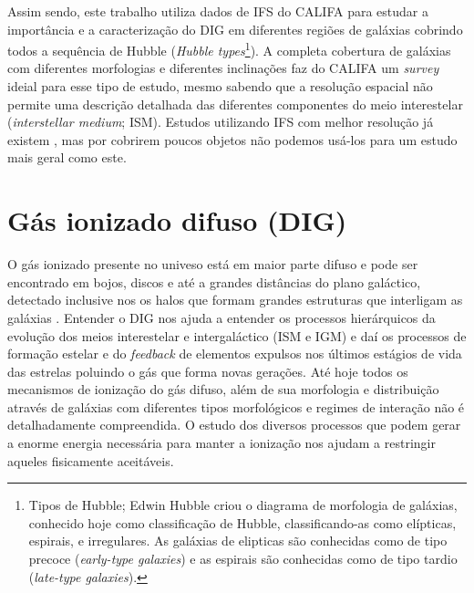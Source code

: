 Assim sendo, este trabalho utiliza dados de IFS do CALIFA para estudar a importância e a caracterização do DIG em diferentes regiões de galáxias cobrindo todos a sequência de Hubble ({\em Hubble types}\footnote{Tipos de Hubble; Edwin Hubble criou o diagrama de morfologia de galáxias, conhecido hoje como classificação de Hubble, classificando-as como elípticas, espirais, e irregulares. As galáxias de elipticas são conhecidas como de tipo precoce ({\em early-type galaxies}) e as espirais são conhecidas como de tipo tardio ({\em late-type galaxies}).}). A completa cobertura de galáxias com diferentes morfologias e diferentes inclinações faz do CALIFA um {\em survey} ideial para esse tipo de estudo, mesmo sabendo que a resolução espacial não permite uma descrição detalhada das diferentes componentes do meio interestelar ({\em interstellar medium}; ISM). Estudos utilizando IFS com melhor resolução já existem \citep{Sanchez.etal.2015MUSE, Vogt.etal.2017a, RousseauNepton.etal.2017}, mas por cobrirem poucos objetos não podemos usá-los para um estudo mais geral como este.


\section{Gás ionizado difuso (DIG)}
\label{sec:intro:DIG}

O gás ionizado presente no univeso está em maior parte difuso e pode ser encontrado em bojos, discos e até a grandes distâncias do plano galáctico, detectado inclusive nos os halos que formam grandes estruturas que interligam as galáxias \citep{Dettmar.etal.2010}. Entender o DIG nos ajuda a entender os processos hierárquicos da evolução dos meios interestelar e intergaláctico (ISM e IGM) e daí os processos de formação estelar e do {\em feedback} de elementos expulsos nos últimos estágios de vida das estrelas poluindo o gás que forma novas gerações. Até hoje todos os mecanismos de ionização do gás difuso, além de sua morfologia e distribuição através de galáxias com diferentes tipos morfológicos e regimes de interação não é detalhadamente compreendida. O estudo dos diversos processos que podem gerar a enorme energia necessária para manter a ionização nos ajudam a restringir aqueles fisicamente aceitáveis.


